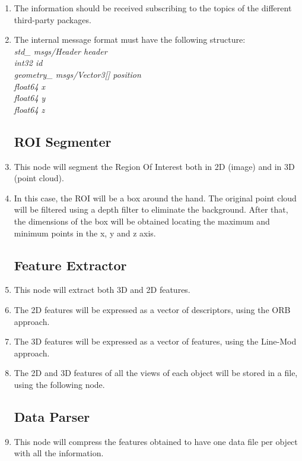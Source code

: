 \documentclass{article}
\makeatletter
\def\threedigits#1{\expandafter\@threedigits\csname c@#1\endcsname}
\def\@threedigits#1{%
  \ifnum#1<100 0\fi
  \ifnum#1<10 0\fi
  \number#1}
\makeatother
\begin{document}
\begin{enumerate}[label=\textbf{FR\threedigits*}]
\item The information should be received subscribing to the topics of the different third-party packages. 
\item The internal message format must have the following structure: \\[0.3cm]
\textit{
std\_ msgs/Header header\\[0.1cm]
int32 id\\[0.1cm]
geometry\_ msgs/Vector3[] position\\
\hspace*{0.5cm}float64 x\\
\hspace*{0.5cm}float64 y\\
\hspace*{0.5cm}float64 z\\
}


\subsection{ROI Segmenter}
	\item This node will segment the Region Of Interest both in 2D (image) and in 3D (point cloud). 
	\item In this case, the ROI will be a box around the hand. The original point cloud will be filtered using a depth filter to eliminate the background. After that, the dimensions of the box will be obtained locating the maximum and minimum points in the x, y and z axis. 


\subsection{Feature Extractor}
\item This node will extract both 3D and 2D features. 
\item The 2D features will be expressed as a vector of descriptors, using the ORB approach. 
\item The 3D features will be expressed as a vector of features, using the Line-Mod approach.

\item The 2D and 3D features of all the views of each object will be stored in a file, using the following node.  

\subsection{Data Parser}
\item This node will compress the features obtained to have one data file per object with all the information.
 

\end{enumerate}
\end{document}
